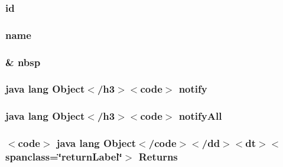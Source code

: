 \hypertarget{_sensor_alerts_8html_acf2488b95c97e0378c9bf49de3b50f28}{
\subsubsection[{id}]{\setlength{\rightskip}{0pt plus 5cm}id}}\label{_sensor_alerts_8html_acf2488b95c97e0378c9bf49de3b50f28}
\hypertarget{_sensor_alerts_8html_ab74e6bf80237ddc4109968cedc58c151}{
\subsubsection[{name}]{\setlength{\rightskip}{0pt plus 5cm}name}}\label{_sensor_alerts_8html_ab74e6bf80237ddc4109968cedc58c151}
\hypertarget{_sensor_alerts_8html_aef915316f784c9063d942974538301a6}{
\subsubsection[{nbsp}]{\setlength{\rightskip}{0pt plus 5cm}\& nbsp}}\label{_sensor_alerts_8html_aef915316f784c9063d942974538301a6}
\hypertarget{_sensor_alerts_8html_ae99ae10b5010594dbda4794e02db271b}{
\subsubsection[{notify}]{\setlength{\rightskip}{0pt plus 5cm}java lang Object$<$/h3$>$$<$code$>$ notify}}\label{_sensor_alerts_8html_ae99ae10b5010594dbda4794e02db271b}
\hypertarget{_sensor_alerts_8html_a1279357e6e09e33e75b55eb05fdb6436}{
\subsubsection[{notify\-All}]{\setlength{\rightskip}{0pt plus 5cm}java lang Object$<$/h3$>$$<$code$>$ notify\-All}}\label{_sensor_alerts_8html_a1279357e6e09e33e75b55eb05fdb6436}
\hypertarget{_sensor_alerts_8html_ac680444a9963d3daf76a635313eac29c}{
\subsubsection[{Returns}]{\setlength{\rightskip}{0pt plus 5cm}$<$code$>$ java lang Object$<$/code$>$$<$/{\bf dd}$>$$<${\bf dt}$>$$<$spanclass=\char`\"{}return\-Label\char`\"{}$>$ Returns}}\label{_sensor_alerts_8html_ac680444a9963d3daf76a635313eac29c}
